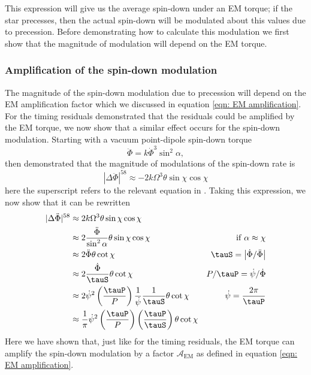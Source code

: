 \documentclass[/home/greg/Thesis/main/main.tex]{subfiles}
\begin{document}
This expression will give us the average spin-down under an EM torque; if the
star precesses, then the actual spin-down will be modulated about this values
due to precession. Before demonstrating how to calculate this modulation we
first show that the magnitude of modulation will depend on the EM torque.

\subsubsection{Amplification of the spin-down modulation}
The magnitude of the spin-down modulation due to precession will 
depend on the EM amplification factor which we discussed in equation 
\eqref{eqn: EM amplification}. For the timing residuals \citet{Jones2001}
demonstrated that the residuals could be amplified by the EM torque, we now
show that a similar effect occurs for the 
spin-down modulation. Starting with a vacuum point-dipole spin-down torque
\begin{equation}
    \ddot{\Phi} = k\dot{\Phi}^{3}\sin^{2}\alpha,
\end{equation}
then \citet{Jones2001} demonstrated that the magnitude of modulations of the 
spin-down rate is
\begin{equation}
    |\Delta\ddot{\Phi}|^{58} \approx -2k\Omega^{3} \theta \sin\chi \cos\chi 
\end{equation}
here the superscript refers to the relevant equation in \citet{Jones2001}. Taking
this expression, we now show that it can be rewritten
\begin{align}
    |\Delta\ddot{\Phi}|^{58} 
    & \approx 2k\Omega^{3} \theta \sin\chi \cos\chi & \\
    & \approx 2 \frac{\ddot{\Phi}}{\sin^{2}\alpha} \theta \sin\chi\cos\chi &
    \mathrm{if }\; \alpha \approx \chi \\
    & \approx 2 \ddot{\Phi}\theta \cot\chi & 
    \tauS = \left| \dot{\Phi} / \ddot{\Phi}\right| \\
    & \approx 2 \frac{\dot{\Phi}}{\tauS} \theta \cot\chi &
    P/\tauP = \dot{\psi}/\dot{\Phi} \\
    & \approx 2 \dot{\psi}^{2}\left(\frac{\tauP}{P}\right) \frac{1}{\dot{\psi}} \frac{1}{\tauS} \theta \cot \chi & \dot{\psi} = \frac{2\pi}{\tauP} \\
    & \approx \frac{1}{\pi}\dot{\psi}^{2}\left(\frac{\tauP}{P}\right)\left(\frac{\tauP}{\tauS}\right) \theta \cot\chi
    \label{eqn: spin-down variations FP EM}
\end{align}
Here we have shown that, just like for the timing residuals, the EM torque can
amplify the spin-down modulation by a factor $\mathcal{A}_{\mathrm{EM}}$ as defined in equation \eqref{eqn: EM amplification}.
\end{document}
